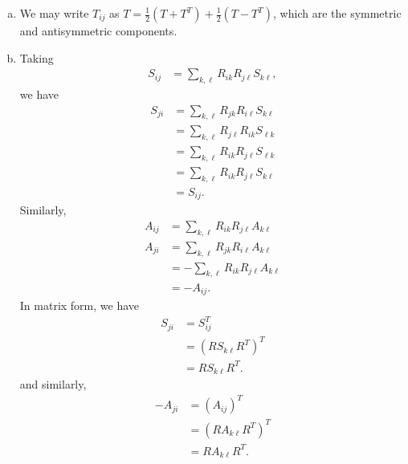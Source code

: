 \documentclass[10pt]{mypackage}
\begin{document}
\begin{enumerate}[(a)]
  \item We may write $T_{ij}$ as $T = \frac{1}{2}\left( T + T^{T} \right) + \frac{1}{2}\left( T - T^{T} \right)$, which are the symmetric and antisymmetric components.
  \item Taking
    \begin{align*}
      S_{ij} &= \sum_{k,\ell}R_{ik}R_{j\ell}S_{k\ell},
    \end{align*}
    we have
    \begin{align*}
      S_{ji} &= \sum_{k,\ell}R_{jk}R_{i\ell}S_{k\ell}\\
             &= \sum_{k,\ell}R_{j\ell}R_{ik}S_{\ell k}\\
             &= \sum_{k,\ell}R_{ik}R_{j\ell}S_{\ell k}\\
             &= \sum_{k,\ell}R_{ik}R_{j \ell}S_{k \ell}\\
             &= S_{ij}.
    \end{align*}
    Similarly,
    \begin{align*}
      A_{ij} &= \sum_{k,\ell}R_{ik}R_{j\ell}A_{k \ell}\\
      A_{ji} &= \sum_{k,\ell}R_{jk}R_{i\ell}A_{k \ell}\\
             &= -\sum_{k,\ell}R_{ik}R_{j\ell}A_{k\ell}\\
             &= -A_{ij}.
    \end{align*}
    In matrix form, we have
    \begin{align*}
      S_{ji} &= S_{ij}^{T}\\
             &= \left( RS_{k\ell} R^{T} \right)^{T}\\
             &= RS_{k\ell}R^{T}.
    \end{align*}
    and similarly,
    \begin{align*}
      -A_{ji} &= \left( A_{ij} \right)^{T}\\
              &= \left( RA_{k\ell}R^{T} \right)^{T}\\
              &= RA_{k\ell}R^{T}.
    \end{align*}
\end{enumerate}
\end{document}
